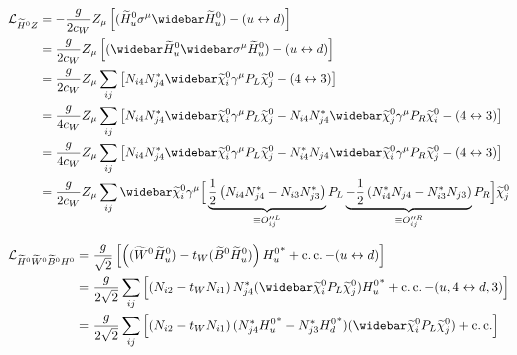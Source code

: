 \documentclass[english, notitlepage]{article}
\begin{document}
            \begin{align} \nonumber
                \L_{\wtilde{H}^0Z} & = -\frac{g}{2c_W} Z_\mu \bclosed{(\hinou\sigma^\mu\barhinou) - (u \leftrightarrow d)}                                                                                                                                                                                                     \\ \nonumber
                                   & = \frac{g}{2c_W} Z_\mu \bclosed{(\barhinou\wbar{\sigma}^\mu\hinou) - (u \leftrightarrow d)}                                                                                                                                                                                               \\ \nonumber
                                   & = \frac{g}{2c_W} Z_\mu \sum_{ij} \bclosed{N_{i4}N_{j4}^* \barnino[i]\gamma^\mu P_L \nino[j] - (4 \leftrightarrow 3)}                                                                                                                                                                      \\ \nonumber
                                   & = \frac{g}{4c_W} Z_\mu \sum_{ij} \bclosed{N_{i4}N_{j4}^* \barnino[i]\gamma^\mu P_L \nino[j] - N_{i4}N_{j4}^* \barnino[j]\gamma^\mu P_R \nino[i] - (4 \leftrightarrow 3)}                                                                                                                  \\ \nonumber
                                   & = \frac{g}{4c_W} Z_\mu \sum_{ij} \bclosed{N_{i4}N_{j4}^* \barnino[i]\gamma^\mu P_L \nino[j] - N_{i4}^*N_{j4} \barnino[i]\gamma^\mu P_R \nino[j] - (4 \leftrightarrow 3)}                                                                                                                  \\
                                   & = \frac{g}{2c_W} Z_\mu \sum_{ij} \barnino[i] \gamma^\mu \Big[ \underbrace{\frac{1}{2}\pclosed{N_{i4}N_{j4}^* - N_{i3}N_{j3}^*}}_{\equiv O^{\prime\prime L}_{ij}}P_L \underbrace{-\frac{1}{2}\pclosed{N_{i4}^*N_{j4} - N_{i3}^*N_{j3}}}_{\equiv O^{\prime\prime R}_{ij}}P_R \Big] \nino[j]
            \end{align}

            \begin{align} \nonumber
                \L_{\wtilde{H}^0 \wino \bino H^0} & = \frac{g}{\sqrt{2}} \bclosed{ \pclosed{(\wino\hinou) - t_W (\bino\hinou)} {H^0_u}^* + \cc - (u \leftrightarrow d)  }                                    \\ \nonumber
                                                  & = \frac{g}{2\sqrt{2}} \sum_{ij} \bclosed{ \pclosed{N_{i2} - t_W N_{i1}}N_{j4}^*(\barnino[i] P_L \nino[j]) {H^0_u}^* + \cc - (u,4 \leftrightarrow d,3)  } \\
                                                  & = \frac{g}{2\sqrt{2}} \sum_{ij} \bclosed{ \pclosed{N_{i2} - t_W N_{i1}}(N_{j4}^* {H^0_u}^* - N_{j3}^* {H^0_d}^* )(\barnino[i] P_L \nino[j]) + \cc  }
            \end{align}
\end{document}
